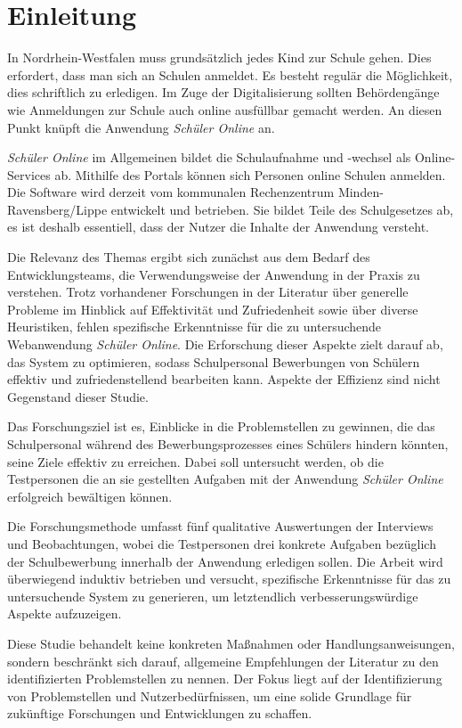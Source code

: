 \section{Einleitung}
In Nordrhein-Westfalen muss grundsätzlich jedes Kind zur Schule gehen.\cite{SchulG_NRW_35} Dies erfordert, dass man sich an Schulen anmeldet. Es besteht regulär die Möglichkeit, dies schriftlich zu erledigen. Im Zuge der Digitalisierung sollten Behördengänge wie Anmeldungen zur Schule auch online ausfüllbar gemacht werden. An diesen Punkt knüpft die Anwendung \textit{Schüler Online} an.

\textit{Schüler Online} im Allgemeinen bildet die Schulaufnahme und -wechsel als Online-Services ab. Mithilfe des Portals können sich Personen online Schulen anmelden. Die Software wird derzeit vom kommunalen Rechenzentrum Minden-Ravensberg/Lippe entwickelt und betrieben. Sie bildet Teile des Schulgesetzes ab, es ist deshalb essentiell, dass der Nutzer die Inhalte der Anwendung versteht. 

Die Relevanz des Themas ergibt sich zunächst aus dem Bedarf des Entwicklungsteams, die Verwendungsweise der Anwendung in der Praxis zu verstehen. Trotz vorhandener Forschungen in der Literatur über generelle Probleme im Hinblick auf Effektivität und Zufriedenheit sowie über diverse Heuristiken, fehlen spezifische Erkenntnisse für die zu untersuchende Webanwendung \textit{Schüler Online}. Die Erforschung dieser Aspekte zielt darauf ab, das System zu optimieren, sodass Schulpersonal Bewerbungen von Schülern effektiv und zufriedenstellend bearbeiten kann. Aspekte der Effizienz sind nicht Gegenstand dieser Studie.

Das Forschungsziel ist es, Einblicke in die Problemstellen zu gewinnen, die das Schulpersonal während des Bewerbungsprozesses eines Schülers hindern könnten, seine Ziele effektiv zu erreichen. Dabei soll untersucht werden, ob die Testpersonen die an sie gestellten Aufgaben mit der Anwendung \textit{Schüler Online} erfolgreich bewältigen können. 

Die Forschungsmethode umfasst fünf qualitative Auswertungen der Interviews und Beobachtungen, wobei die Testpersonen drei konkrete Aufgaben bezüglich der Schulbewerbung innerhalb der Anwendung erledigen sollen. Die Arbeit wird überwiegend induktiv betrieben und versucht, spezifische Erkenntnisse für das zu untersuchende System zu generieren, um letztendlich verbesserungswürdige Aspekte aufzuzeigen.

Diese Studie behandelt keine konkreten Maßnahmen oder Handlungsanweisungen, sondern beschränkt sich darauf, allgemeine Empfehlungen der Literatur zu den identifizierten Problemstellen zu nennen. Der Fokus liegt auf der Identifizierung von Problemstellen und Nutzerbedürfnissen, um eine solide Grundlage für zukünftige Forschungen und Entwicklungen zu schaffen.

